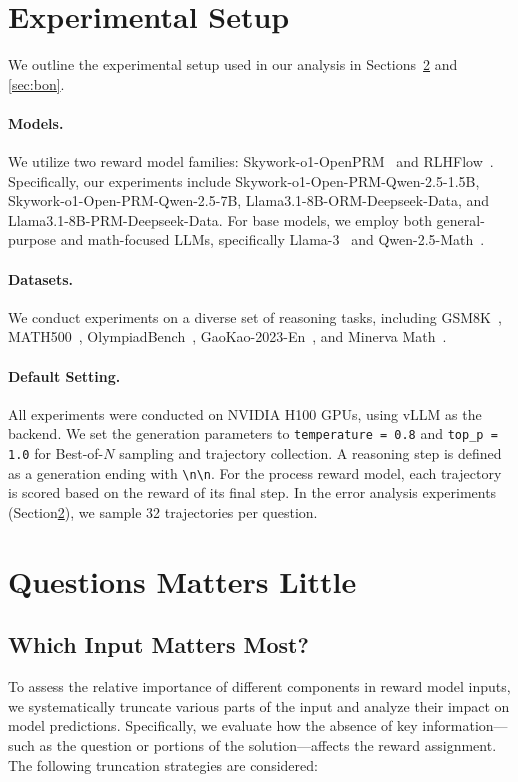 \documentclass{article}
\begin{document}
\section{Experimental Setup} \label{sec:setup}
We outline the experimental setup used in our analysis in Sections~\ref{sec:error} and \ref{sec:bon}.

\paragraph{Models.} We utilize two reward model families: Skywork-o1-OpenPRM~\citep{skyworkopeno12024} and RLHFlow~\citep{xiong2024implementation}. Specifically, our experiments include Skywork-o1-Open-PRM-Qwen-2.5-1.5B, Skywork-o1-Open-PRM-Qwen-2.5-7B, Llama3.1-8B-ORM-Deepseek-Data, and Llama3.1-8B-PRM-Deepseek-Data. For base models, we employ both general-purpose and math-focused LLMs, specifically Llama-3~\citep{dubey2024llama} and Qwen-2.5-Math~\citep{yang2024qwen2math}. 

\paragraph{Datasets.} We conduct experiments on a diverse set
of reasoning tasks, including GSM8K~\citep{cobbe2021training}, MATH500~\citep{hendrycks2021measuring}, OlympiadBench~\citep{he2024olympiadbench}, GaoKao-2023-En~\citep{liao2024mario}, and Minerva Math~\cite{minerva}.

\paragraph{Default Setting.} All experiments were conducted on NVIDIA H100 GPUs, using vLLM\citep{kwon2023efficient} as the backend. We set the generation parameters to \texttt{temperature = 0.8} and \texttt{top\_p = 1.0} for Best-of-$N$ sampling and trajectory collection. A reasoning step is defined as a generation ending with \texttt{\textbackslash n\textbackslash n}. For the process reward model, each trajectory is scored based on the reward of its final step. In the error analysis experiments (Section\ref{sec:error}), we sample 32 trajectories per question.

\section{Questions Matters Little} \label{sec:error}
\subsection{Which Input Matters Most?}
To assess the relative importance of different components in reward model inputs, we systematically truncate various parts of the input and analyze their impact on model predictions. Specifically, we evaluate how the absence of key information—such as the question or portions of the solution—affects the reward assignment. The following truncation strategies are considered:
\end{document}
